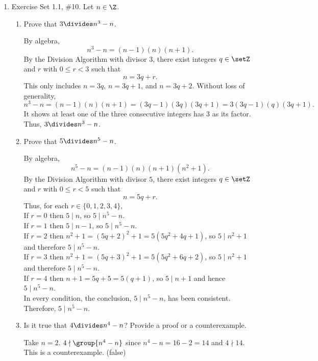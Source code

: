 \begin{enumerate}
  \item Exercise Set 1.1, \#10. Let $n\in \Z$.
  \begin{enumerate}
    \item Prove that $3\divides n^{3}-n$.
    \begin{subprove}
      By algebra,
      \[
        n^{3}-n = (n-1)(n)(n+1).
      \]
      By the Division Algorithm with divisor $3$, there exist integers $q\in\setZ$ and $r$ with $0\le r<3$ such that
      \[
        n = 3q + r.
      \] 
      This only includes $n = 3q$, $n = 3q + 1$, and $n = 3q + 2$.
      Without loss of generality, 
      \[
        n^{3}-n = (n-1)(n)(n+1)=(3q-1)(3q)(3q+1)=3(3q-1)(q)(3q+1).
      \]
      It shows at least one of the three consecutive integers has $3$ as its factor.
      Thus, $3\divides n^{3}-n$.
    \end{subprove}
    \item Prove that $5\divides n^{5}-n$.
    \begin{subprove}
      By algebra,
      \[
      n^{5}-n = (n-1)(n)(n+1)(n^{2}+1).
      \]
      By the Division Algorithm with divisor $5$, there exist integers $q\in\setZ$ and $r$ with $0\le r<5$ such that
      \[
      n = 5q + r.
      \]
      Thus, for each $r\in\{0,1,2,3,4\}$, \\
      If $r=0$ then $5\mid n$, so $5\mid n^{5}-n$.\\
      If $r=1$ then $5\mid n-1$, so $5\mid n^{5}-n$.\\
      If $r=2$ then $n^{2}+1=(5q+2)^{2}+1=5(5q^{2}+4q+1)$, so $5\mid n^{2}+1$ and therefore $5\mid n^{5}-n$.\\
      If $r=3$ then $n^{2}+1=(5q+3)^{2}+1=5(5q^{2}+6q+2)$, so $5\mid n^{2}+1$ and therefore $5\mid n^{5}-n$.\\
      If $r=4$ then $n+1=5q+5=5(q+1)$, so $5\mid n+1$ and hence $5\mid n^{5}-n$.\\
      In every condition, the conclusion, $5\mid n^{5}-n$, has been consistent. Therefore, $5\mid n^{5}-n$.
    \end{subprove}
    \item Is it true that $4 \divides n^{4}-n$? Provide a proof or a counterexample.
    \begin{subanswer}
      Take $n=2$. $4 \nmid \group{n^{4}-n}$ since $n^{4}-n=16-2=14$ and $4\nmid14$. This is a counterexample. (false)
    \end{subanswer}
  \end{enumerate}

  \newpage


\end{enumerate}
